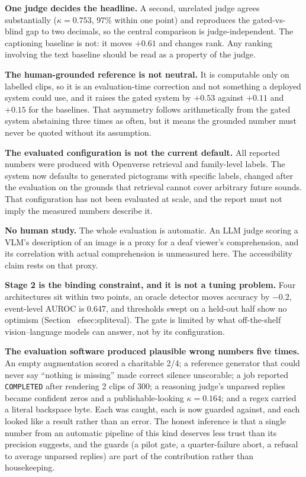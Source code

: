 \documentclass[11pt,a4paper]{article}
\begin{document}
\textbf{One judge decides the headline.} A second, unrelated judge agrees substantially
($\kappa = 0.753$, 97\% within one point) and reproduces the gated-vs-blind gap to two decimals, so
the central comparison is judge-independent. The captioning baseline is not: it moves $+0.61$ and
changes rank. Any ranking involving the text baseline should be read as a property of the judge.

\textbf{The human-grounded reference is not neutral.} It is computable only on labelled clips, so it
is an evaluation-time correction and not something a deployed system could use, and it raises the
gated system by $+0.53$ against $+0.11$ and $+0.15$ for the baselines. That asymmetry follows
arithmetically from the gated system abstaining three times as often, but it means the grounded
number must never be quoted without its assumption.

\textbf{The evaluated configuration is not the current default.} All reported numbers were produced
with Openverse retrieval and family-level labels. The system now defaults to generated pictograms
with specific labels, changed after the evaluation on the grounds that retrieval cannot cover
arbitrary future sounds. That configuration has not been evaluated at scale, and the report must not
imply the measured numbers describe it.

\textbf{No human study.} The whole evaluation is automatic. An LLM judge scoring a VLM's description
of an image is a proxy for a deaf viewer's comprehension, and its correlation with actual
comprehension is unmeasured here. The accessibility claim rests on that proxy.

\textbf{Stage 2 is the binding constraint, and it is not a tuning problem.} Four architectures sit
within two points, an oracle detector moves accuracy by $-0.2$, event-level AUROC is 0.647, and
thresholds swept on a held-out half show no optimism (Section~
ef{sec:spliteval}). The gate is
limited by what off-the-shelf vision--language models can answer, not by its configuration.

\textbf{The evaluation software produced plausible wrong numbers five times.} An empty augmentation
scored a charitable 2/4; a reference generator that could never say ``nothing is missing'' made
correct silence unscorable; a job reported \texttt{COMPLETED} after rendering 2 clips of 300; a
reasoning judge's unparsed replies became confident zeros and a publishable-looking
$\kappa = 0.164$; and a regex carried a literal backspace byte. Each was caught, each is now guarded
against, and each looked like a result rather than an error. The honest inference is that a single
number from an automatic pipeline of this kind deserves less trust than its precision suggests, and
the guards (a pilot gate, a quarter-failure abort, a refusal to average unparsed replies) are part of
the contribution rather than housekeeping.
\end{document}
